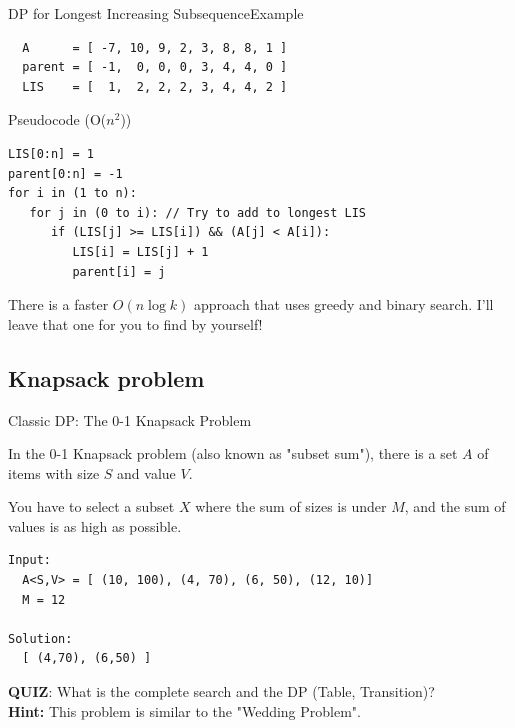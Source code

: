 \begin{frame}[fragile]{DP for Longest Increasing Subsequence}{Example}
\begin{verbatim}
  A      = [ -7, 10, 9, 2, 3, 8, 8, 1 ]
  parent = [ -1,  0, 0, 0, 3, 4, 4, 0 ]
  LIS    = [  1,  2, 2, 2, 3, 4, 4, 2 ]
\end{verbatim}

\begin{block}{Pseudocode (O($n^2$))}
\begin{verbatim}
LIS[0:n] = 1
parent[0:n] = -1
for i in (1 to n):
   for j in (0 to i): // Try to add to longest LIS
      if (LIS[j] >= LIS[i]) && (A[j] < A[i]):
         LIS[i] = LIS[j] + 1
         parent[i] = j
\end{verbatim}
\end{block}

There is a faster $O(n\log k)$ approach that uses greedy and binary search. I'll leave that one for you to find by yourself!
\end{frame}


\subsection{Knapsack problem}
\begin{frame}[fragile]{Classic DP: The 0-1 Knapsack Problem}

  In the 0-1 Knapsack problem (also known as "subset sum"), there is a set $A$ of items with size $S$ and value $V$.\bigskip

  You have to select a subset $X$ where the sum of sizes is under $M$, and the sum of values is as high as possible.\bigskip

\begin{verbatim}
Input:
  A<S,V> = [ (10, 100), (4, 70), (6, 50), (12, 10)]
  M = 12

Solution:
  [ (4,70), (6,50) ]
\end{verbatim}\bigskip

{\bf QUIZ}: What is the complete search and the DP (Table, Transition)?\\
{\bf Hint:} This problem is similar to the "Wedding Problem".
\end{frame}

